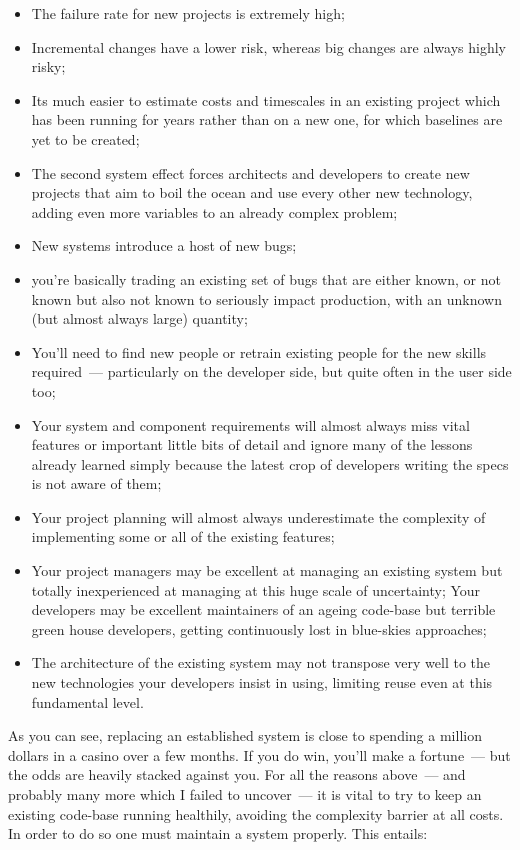 \documentclass{memoir}
\begin{document}
\begin{itemize}
\item The failure rate for new projects is extremely high;
\item Incremental changes have a lower risk, whereas big changes are
  always highly risky;
\item Its much easier to estimate costs and timescales in an existing
  project which has been running for years rather than on a new one,
  for which baselines are yet to be created;
\item The second system effect forces architects and developers to
  create new projects that aim to boil the ocean and use every other
  new technology, adding even more variables to an already complex
  problem;
\item New systems introduce a host of new bugs;
\item you're basically trading an existing set of bugs that are either
  known, or not known but also not known to seriously impact
  production, with an unknown (but almost always large) quantity;
\item You'll need to find new people or retrain existing people for the
  new skills required~--- particularly on the developer side, but quite
  often in the user side too;
\item Your system and component requirements will almost always miss
  vital features or important little bits of detail and ignore many of
  the lessons already learned simply because the latest crop of
  developers writing the specs is not aware of them;
\item Your project planning will almost always underestimate the
  complexity of implementing some or all of the existing features;
\item Your project managers may be excellent at managing an existing
  system but totally inexperienced at managing at this huge scale of
  uncertainty; Your developers may be excellent maintainers of an
  ageing code-base but terrible green house developers, getting
  continuously lost in blue-skies approaches;
\item The architecture of the existing system may not transpose very
  well to the new technologies your developers insist in using,
  limiting reuse even at this fundamental level.
\end{itemize}

As you can see, replacing an established system is close to spending a
million dollars in a casino over a few months. If you do win, you'll
make a fortune~--- but the odds are heavily stacked against you. For all
the reasons above~--- and probably many more which I failed to uncover~---
it is vital to try to keep an existing code-base running healthily,
avoiding the complexity barrier at all costs. In order to do so one
must maintain a system properly. This entails:
\end{document}
